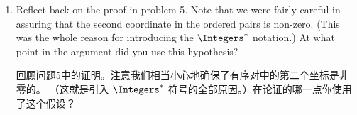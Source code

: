 \begin{enumerate}
    \item Reflect back on the proof in problem 5.  Note that we were fairly
    careful in assuring that the second coordinate in the ordered pairs is
    non-zero.
    (This was the whole reason for introducing the 
    $\Integers^{\ast}$ notation.)  At what point in the argument did you
    use this hypothesis?
    
    \noindent  回顾问题5中的证明。注意我们相当小心地确保了有序对中的第二个坐标是非零的。
    （这就是引入 $\Integers^{\ast}$ 符号的全部原因。）在论证的哪一点你使用了这个假设？
    
    \wbvfill
    
    \workbookpagebreak
    
    \end{enumerate} 
    
